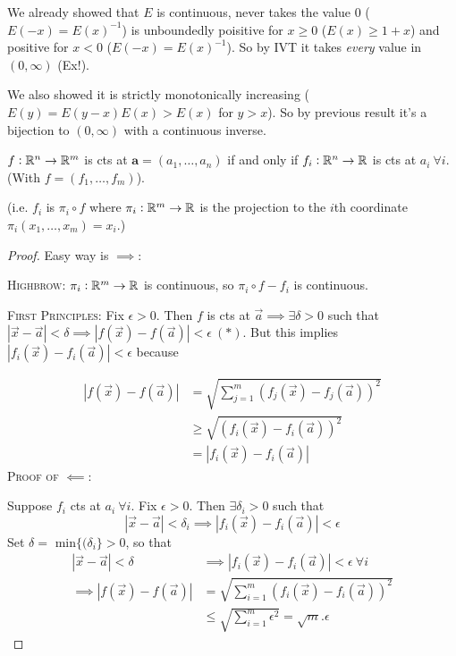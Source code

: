 \documentclass[twoside]{scrartcl}
\begin{document}
We already showed that $E$ is continuous, never takes the value $0$ ($E(-x) = E(x)^{-1}$) is unboundedly poisitive for $x \geq 0$ ($E(x) \geq 1 + x$) and positive for $x < 0$ ($E(-x) = E(x)^{-1}$). So by IVT it takes \emph{every} value in $(0,\infty)$ (Ex!). 

We also showed it is strictly monotonically increasing ($E(y) = E(y-x)E(x) > E(x)$ for $y > x$). So by previous result it's a bijection to $(0,\infty)$ with a continuous inverse.\\

\begin{theorem}
	$f:\mathbb{R}^n \to \mathbb{R}^m$ is cts at $\mathbf{a} = (a_1,\dots,a_n)$ if and only if $f_i:\mathbb{R}^n \to \mathbb{R}$ is cts at $a_i~\forall i$. (With $f = (f_1,\dots,f_m)$).
\end{theorem}

(i.e. $f_i$ is $\pi_i \circ f$ where $\pi_i: \mathbb{R}^m \to \mathbb{R}$ is the projection to the $i$th coordinate $\pi_i(x_1,\dots,x_m) = x_i$.)

\begin{proof}

Easy way is $\implies$:

\textsc{Highbrow:} $\pi_i: \mathbb{R}^m \to \mathbb{R}$ is continuous, so $\pi_i \circ f - f_i$ is continuous.

\textsc{First Principles:}
	Fix $\epsilon >0.$ Then $f$ is cts at $\vec{a} \implies \exists \delta >0 $ such that $|\vec{x} - \vec{a}| < \delta  \implies |f(\vec{x}) - f(\vec{a})| < \epsilon ~(*)$. But this implies $|f_i(\vec{x}) - f_i(\vec{a})| < \epsilon$ because
	
\[\begin{aligned}
|f(\vec{x}) - f(\vec{a})| &= \sqrt{\sum_{j=1}^m (f_j(\vec{x}) - f_j(\vec{a}))^2}\\
&\geq \sqrt{(f_i(\vec{x}) - f_i(\vec{a}))^2}\\
&= |f_i(\vec{x}) - f_i(\vec{a})| 	
\end{aligned}
\]	
\textsc{Proof of $\impliedby$:}

	Suppose $f_i$ cts at $a_i~\forall i$. Fix $\epsilon > 0$. Then $\exists \delta_i > 0$ such that \[|\vec{x} - \vec{a}| < \delta_i \implies |f_i(\vec{x}) - f_i(\vec{a})| < \epsilon\]
	 Set $\delta =$ min$\{(\delta_i\} >0$, so that 
	 \[\begin{aligned}|\vec{x} - \vec{a}| < \delta &\implies |f_i(\vec{x}) - f_i(\vec{a})| < \epsilon ~\forall i\\
	  \implies |f(\vec{x}) - f(\vec{a})| &= \sqrt{\sum_{i=1}^m (f_i(\vec{x}) - f_i(\vec{a}))^2} \\
	  &\leq \sqrt{\sum_{i=1}^m \epsilon^2} = \sqrt{m}.\epsilon	
\end{aligned}
\]
\end{proof}
\end{document}
